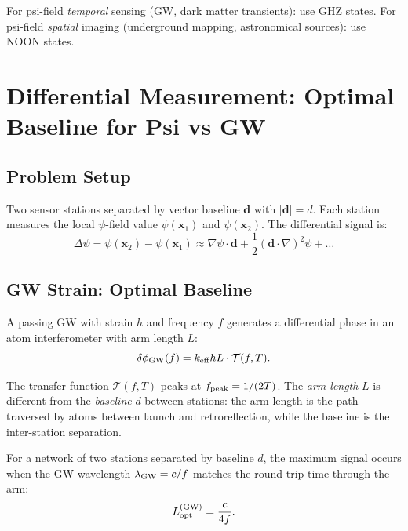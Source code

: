 \documentclass[11pt]{article}
\theoremstyle{definition}
\theoremstyle{remark}
\begin{document}
For psi-field \emph{temporal} sensing (GW, dark matter transients):
use GHZ states. For psi-field \emph{spatial} imaging (underground mapping,
astronomical sources): use NOON states.

\section{Differential Measurement: Optimal Baseline for Psi vs GW}

\subsection{Problem Setup}

Two sensor stations separated by vector baseline $\mathbf{d}$ with $|\mathbf{d}|
= d$. Each station measures the local $\psi$-field value $\psi(\mathbf{x}_1)$
and $\psi(\mathbf{x}_2)$. The differential signal is:
\begin{equation}
\Delta\psi = \psi(\mathbf{x}_2) - \psi(\mathbf{x}_1)
\approx \nabla\psi \cdot \mathbf{d}
+ \frac{1}{2}(\mathbf{d}\cdot\nabla)^2\psi + \ldots
\end{equation}

\subsection{GW Strain: Optimal Baseline}

A passing GW with strain $h$ and frequency $f$ generates a differential
phase in an atom interferometer with arm length $L$:
\begin{equation}
\delta\phi_{\rm GW}(f) = k_{\rm eff} h L \cdot \mathcal{T}(f, T).
\end{equation}

The transfer function $\mathcal{T}(f, T)$ peaks at $f_{\rm peak} = 1/(2T)$.
The \emph{arm length} $L$ is different from the \emph{baseline} $d$ between
stations: the arm length is the path traversed by atoms between launch and
retroreflection, while the baseline is the inter-station separation.

For a network of two stations separated by baseline $d$, the maximum signal
occurs when the GW wavelength $\lambda_{\rm GW} = c/f$ matches the round-trip
time through the arm:
\begin{equation}
L_{\rm opt}^{(\rm GW)} = \frac{c}{4f}.
\label{eq:L-opt-GW}
\end{equation}
\end{document}
